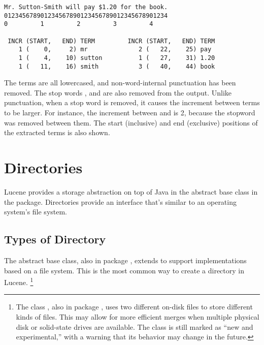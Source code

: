 \begin{verbatim}
Mr. Sutton-Smith will pay $1.20 for the book.
012345678901234567890123456789012345678901234
0         1         2         3         4

 INCR (START,   END) TERM         INCR (START,   END) TERM
    1 (    0,     2) mr              2 (   22,    25) pay
    1 (    4,    10) sutton          1 (   27,    31) 1.20
    1 (   11,    16) smith           3 (   40,    44) book
\end{verbatim}
%
The terms are all lowercased, and non-word-internal punctuation has
been removed.  The stop words , 
and  are also removed from the output.  Unlike
punctuation, when a stop word is removed, it causes the increment
between terms to be larger.  For instance, the increment between
 and  is 2, because the stopword
 was removed between them.  The start (inclusive)
and end (exclusive) positions of the extracted terms is also shown.


\section{Directories}\label{section:lucene-directory}

Lucene provides a storage abstraction on top of Java in the abstract
base class  in the 
package.  Directories provide an interface that's similar to an
operating system's file system.

\subsection{Types of Directory}

The  abstract base class, also in package
, extends  to support implementations
based on a file system.  This is the most common way to create a
directory in Lucene.%
%
\footnote{The class , also in package
  , uses two different on-disk files to store different
  kinds of files.  This may allow for more efficient merges when
  multiple physical disk or solid-state drives are available.  The
  class is still marked as ``new and experimental,'' with a warning
  that its behavior may change in the future.}

